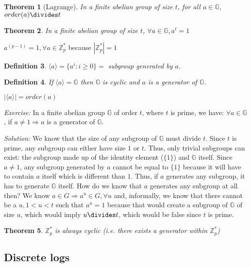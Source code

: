 \documentclass[12pt]{article}
\newtheorem{thm}{Theorem}[section]
\newtheorem{definition}[thm]{Definition}
\newcommand{\Zp}{\mathbb{Z}^{\ast}_p}
\newcommand{\G}{\mathbb{G}}
\newcommand{\gen}[1]{\langle #1 \rangle}
\begin{document}
\begin{thm}[Lagrange]
In a finite abelian group of size $t$, for all $a \in \G$, $order(a) \divides t$
\end{thm}

\begin{thm}
In a finite abelian group of size $t$, $\forall a \in \G, a^t = 1$
\end{thm}

\begin{example}
$a^{(p-1)} = 1, \forall a \in \Zp$ because $|\Zp| = 1$
\end{example}

\begin{definition}
$\gen{a} = \{a^i : i \ge 0\} = $ subgroup generated by $a$.
\end{definition}

\begin{definition}
If $\gen{a} = \G$ then $\G$ is \emph{cyclic} and $a$ is a
\emph{generator} of $\G$.
\end{definition}

\begin{note}
$|\gen{a}| = order(a)$
\end{note}

\emph{Exercise:} In a finite abelian group $\G$ of order $t$, where $t$ is
prime, we have: $\forall a \in \G$, if $a \ne 1 \Rightarrow a$ is a generator of $\G$.

\emph{Solution:} We know that the size of any subgroup of $\G$ must divide $t$.
Since $t$ is prime, any subgroup can either have size $1$ or $t$. Thus, only
trivial subgroups can exist: the subgroup made up of the identity element
($\{1\}$) and $\G$ itself. Since $a \ne 1$, any subgroup generated by $a$ cannot
be equal to $\{1\}$ because it will have to contain $a$ itself which is
different than $1$.  Thus, if $a$ generates any subgroup, it has to generate
$\G$ itself. How do we know that $a$ generates any subgroup at all then? We know
$a \in G \Rightarrow a^u \in G, \forall u$ and, informally, we know that there
cannot be a $u, 1 < u < t$ such that $a^u = 1$ because that would create a
subgroup of $\G$ of size $u$, which would imply $u \divides t$, which would be
false since $t$ is prime.

\begin{thm}
$\Zp$ is always cyclic (i.e. there exists a generator within $\Zp$)
\end{thm}


\subsection{Discrete logs}
\end{document}
